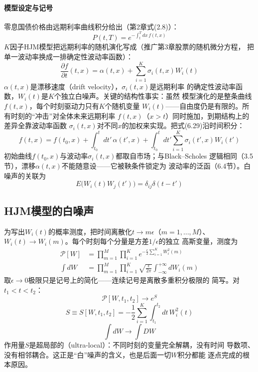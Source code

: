 \paragraph{模型设定与记号}
零息国债价格由远期利率曲线积分给出（第2章式(2.8)）：
\begin{equation*}
P(t,T)=e^{-\int_{t}^{T}dx\,f(t,x)}
\tag{6.28}
\end{equation*}
$K$因子HJM模型把远期利率的随机演化写成（推广第3章股票的随机微分方程，
把单一波动率换成一排确定性波动率函数）：
\begin{equation*}
\frac{\partial f}{\partial t}(t,x)=\alpha(t,x)+\sum_{i=1}^{K}
\sigma_i(t,x)W_i(t)
\tag{6.29}
\end{equation*}
$\alpha(t,x)$是漂移速度（drift velocity），$\sigma_i(t,x)$是远期利率
的确定性波动率函数，$W_i(t)$是$K$个独立白噪声。关键的结构性事实：虽然
模型演化的是整条曲线$f(t,x)$，每个时刻驱动力只有$K$个随机变量
$W_i(t)$——自由度仍是有限的。所有时刻的“冲击”对全体未来远期利率
$f(t,x)$（$x>t$）同时施加，到期结构上的差异全靠波动率函数
$\sigma_i(t,x)$对不同$x$的加权来实现。把式(6.29)沿时间积分：
\begin{equation*}
f(t,x)=f(t_0,x)+\int_{t_0}^{t}dt'\,\alpha(t',x)
+\int_{t_0}^{t}dt'\sum_{i=1}^{K}\sigma_i(t',x)W_i(t')
\tag{6.30}
\end{equation*}
初始曲线$f(t_0,x)$与波动率$\sigma_i(t,x)$都取自市场；与Black--Scholes
逻辑相同（3.5节），漂移$\alpha(t,x)$不能随意设——它被鞅条件锁定为
波动率的泛函（6.4节）。白噪声的关联为
\begin{equation*}
E\bigl(W_i(t)W_j(t')\bigr)=\delta_{ij}\delta(t-t')
\end{equation*}

\subsection*{HJM模型的白噪声}

为写出$W_i(t)$的概率测度，把时间离散化$t\to m\epsilon$（$m=1,\ldots
,M$）、$W_i(t)\to W_i(m)$。每个时刻每个分量是方差$1/\epsilon$的独立
高斯变量，测度为
\begin{align*}
\mathcal{P}[W]&=\prod_{m=1}^{M}\prod_{i=1}^{K}
e^{-\frac{\epsilon}{2}\sum_{i=1}^{K}W_i^2(m)}\\
\int dW&=\prod_{m=1}^{M}\prod_{i=1}^{K}\sqrt{\frac{\epsilon}{2\pi}}
\int_{-\infty}^{+\infty}dW_i(m)
\tag{6.31}
\end{align*}
取$\epsilon\to0$极限只是记号上的简化——连续记号是离散多重积分极限的
简写。对$t_1<t<t_2$：
\begin{equation*}
\mathcal{P}[W,t_1,t_2]\to e^{S}
\tag{6.32}
\end{equation*}
\begin{equation*}
S\equiv S[W,t_1,t_2]=-\frac{1}{2}\sum_{i=1}^{K}\int_{t_1}^{t_2}
dt\,W_i^2(t)
\tag{6.33}
\end{equation*}
\begin{equation*}
\int dW\to\int DW
\tag{6.34}
\end{equation*}
作用量$S$是超局部的（ultra-local）：不同时刻的变量完全解耦，没有时间
导数项、没有相邻耦合。这正是“白”噪声的含义，也是后面一切$W$积分都能
逐点完成的根本原因。

